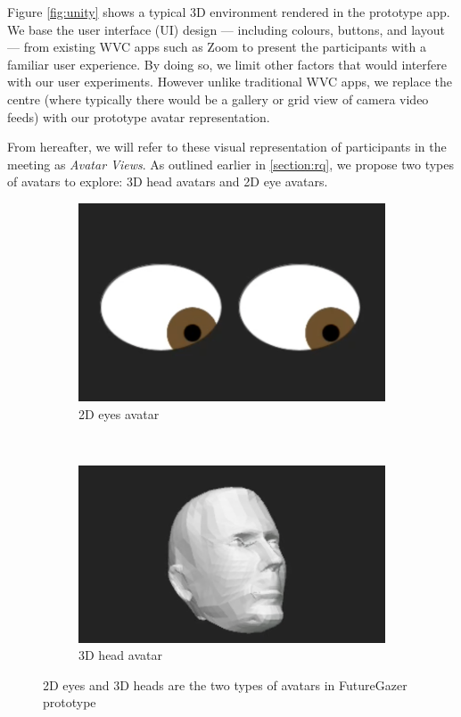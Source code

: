 Figure \ref{fig:unity} shows a typical 3D environment rendered in the prototype app. We base the user interface (UI) design --- including colours, buttons, and layout --- from existing WVC apps such as Zoom to present the participants with a familiar user experience. By doing so, we limit other factors that would interfere with our user experiments. However unlike traditional WVC apps, we replace the centre (where typically there would be a gallery or grid view of camera video feeds) with our prototype avatar representation.

From hereafter, we will refer to these visual representation of participants in the meeting as \textit{Avatar Views}. As outlined earlier in \ref{section:rq}, we propose two types of avatars to explore: 3D head avatars and 2D eye avatars. 

\begin{figure}
    \centering
    \begin{subfigure}[b]{0.4\textwidth}
        \includegraphics[width=\textwidth]{eyes.png}
        \caption{2D eyes avatar}
        \label{fig:eyes}
    \end{subfigure}
    ~
    \begin{subfigure}[b]{0.4\textwidth}
        \includegraphics[width=\textwidth]{head.png}
        \caption{3D head avatar}
        \label{fig:head}
    \end{subfigure}
    \caption{2D eyes and 3D heads are the two types of avatars in FutureGazer prototype}
\end{figure}

